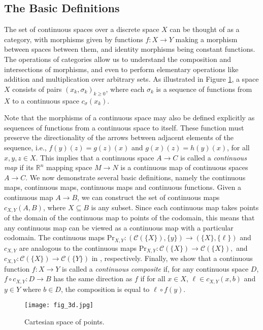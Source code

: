 \documentclass[a4paper,reqno,oneside]{article}
\begin{document}
\subsection*{The Basic Definitions}
The set of continuous spaces over a discrete space $X$ can be thought of as a category, with morphisms given by functions $f : X \to Y$ making a morphism between spaces between them, and identity morphisms being constant functions. The operations of categories allow us to understand the composition and intersections of morphisms, and even to perform elementary operations like addition and multiplication over arbitrary sets. As illustrated in Figure \ref{fig:M2M}, a space $X$ consists of pairs $(x_k, \sigma_k)_{k \ge 0}$, where each $\sigma_k$ is a sequence of functions from $X$ to a continuous space $c_\sigma(x_k)$.

Note that the morphisms of a continuous space may also be defined explicitly as sequences of functions from a continuous space to itself. These function must preserve the directionality of the arrows between adjacent elements of the sequence, i.e., $f(y)(z) = g(z)(x)$ and $g(x)(z) = h(y)(x)$, for all $x,y,z \in X$. This implies that a continuous space $A \to C$ is called a \textit{continuous map} if its $\mathbb{R}^n$ mapping space $M \to N$ is a continuous map of continuous spaces $A \to C$. We now demonstrate several basic definitions, namely the continuous maps, continuous maps, continuous maps and continuous functions. Given a continuous map $A \to B$, we can construct the set of continuous maps $c_{X,Y}(A,B)$, where $X \subseteq B$ is any subset. Since each continuous map takes points of the domain of the continuous map to points of the codomain, this means that any continuous map can be viewed as a continuous map with a particular codomain. The continuous maps $\mathrm{Pr}_{X,Y} : (\mathcal{C}({\{X\}}), {\{y\}}) \to ({\{X\}},\{\ell\})$ and $c_{X,Y}$ are analogous to the continuous maps $\mathrm{Pr}_{X,Y} : \mathcal{C}(\{X\}) \to \mathcal{C}(\{X\}),$ and $c_{X,Y}: \mathcal{C}(\{X\}) \to \mathcal{C}(\{Y\})$ in \cite{MacLane94}, respectively. Finally, we show that a continuous function $f : X \to Y$ is called a \textit{continuous composite} if, for any continuous space $D$, $f\circ c_{X,Y} : D \to B$ has the same direction as $f$ if for all $x \in X$, $\ell \in c_{X,Y}(x,b)$ and $y \in Y$ where $b \in D$, the composition is equal to $\ell \circ f(y)$.

\begin{figure}[ht]
\centering
\texttt{[image: fig\_3d.jpg]}
\caption{Cartesian space of points.}
\label{fig:M2M}
\end{figure}
\end{document}
